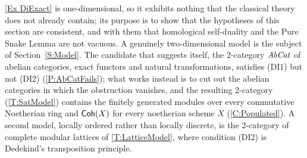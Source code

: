\begin{remark}
  \label{Rem Model}
  \exax\ref{Ex DiExact} is one-dimensional, so it exhibits nothing that the classical theory does not already contain; its purpose is to show that the hypotheses of this section are consistent, and with them that homological self-duality and the Pure Snake Lemma are not vacuous. A genuinely two-dimensional model is the subject of Section~\ref{S:Model}. The candidate that suggests itself, the 2-category \(\mathit{AbCat}\) of abelian categories, exact functors and natural transformations, satisfies \textup{(DI1)} but not \textup{(DI2)} (\prox\ref{P:AbCatFails}); what works instead is to cut out the abelian categories in which the obstruction vanishes, and the resulting 2-category (\thex\ref{T:SatModel}) contains the finitely generated modules over every commutative Noetherian ring and \(\mathsf{Coh}(X)\) for every noetherian scheme \(X\) (\corx\ref{C:Populated}). A second model, locally ordered rather than locally discrete, is the 2-category of complete modular lattices of \thex\ref{T:LatticeModel}, where condition \textup{(DI2)} is Dedekind's transposition principle.
\end{remark}

